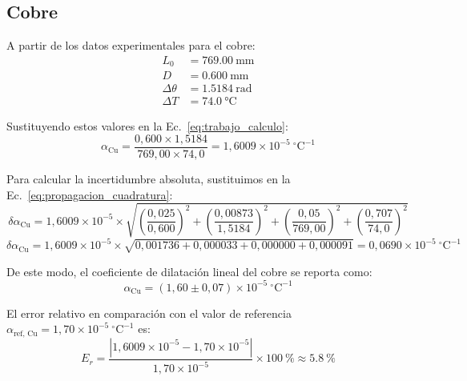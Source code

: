 \subsection{Cobre}

A partir de los datos experimentales para el cobre:
\begin{align*}
    L_0 &= \qty{769,00}{\milli\meter} \\
    D &= \qty{0,600}{\milli\meter} \\
    \Delta\theta &= \qty{1,5184}{\radian} \\
    \Delta T &= \qty{74,0}{\celsius}
\end{align*}

Sustituyendo estos valores en la Ec.~\eqref{eq:trabajo_calculo}:
\begin{equation*}
    \alpha_{\text{Cu}} = \frac{0{,}600 \times 1{,}5184}{769{,}00 \times 74{,}0} = 1{,}6009 \times 10^{-5}\ ^\circ\text{C}^{-1}
\end{equation*}

Para calcular la incertidumbre absoluta, sustituimos en la Ec.~\eqref{eq:propagacion_cuadratura}:
\begin{equation*}
    \delta\alpha_{\text{Cu}} = 1{,}6009 \times 10^{-5} \times \sqrt{
        \left(\frac{0{,}025}{0{,}600}\right)^2 +
        \left(\frac{0{,}00873}{1{,}5184}\right)^2 +
        \left(\frac{0{,}05}{769{,}00}\right)^2 +
        \left(\frac{0{,}707}{74{,}0}\right)^2
    }
\end{equation*}
\begin{equation*}
    \delta\alpha_{\text{Cu}} = 1{,}6009 \times 10^{-5} \times \sqrt{
        0{,}001736 + 0{,}000033 + 0{,}000000 + 0{,}000091
    } = 0{,}0690 \times 10^{-5}\ ^\circ\text{C}^{-1}
\end{equation*}

De este modo, el coeficiente de dilatación lineal del cobre se reporta como:
\begin{equation}
    \alpha_{\text{Cu}} = (1{,}60 \pm 0{,}07) \times 10^{-5}\ ^\circ\text{C}^{-1}
    \label{eq:res_cu}
\end{equation}

El error relativo en comparación con el valor de referencia $\alpha_{\text{ref, Cu}} = 1{,}70 \times 10^{-5}\ ^\circ\text{C}^{-1}$ es:
\begin{equation*}
    E_r = \frac{|1{,}6009 \times 10^{-5} - 1{,}70 \times 10^{-5}|}{1{,}70 \times 10^{-5}} \times \qty{100}{\percent} \approx \qty{5,8}{\percent}
\end{equation*}

